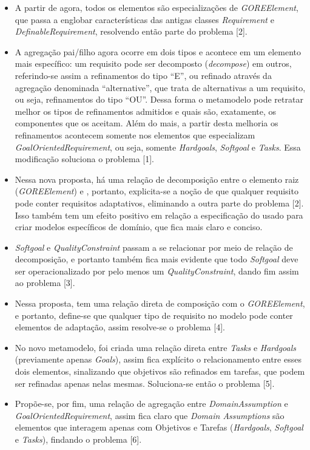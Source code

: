 \begin{itemize}
	\item A partir de agora, todos os elementos são especializações de \textit{GOREElement}, que passa a englobar características das antigas classes \textit{Requirement} e \textit{DefinableRequirement}, resolvendo então parte do problema [2]. 

	\item A agregação pai/filho agora ocorre em dois tipos e acontece em um elemento mais específico: um requisito pode ser decomposto (\textit{decompose}) em outros, referindo-se assim a refinamentos do tipo ``E'', ou refinado através da agregação denominada ``alternative'', que trata de alternativas a um requisito, ou seja, refinamentos do tipo ``OU''. Dessa forma o metamodelo pode retratar melhor os tipos de refinamentos admitidos e quais são, exatamente, os componentes que  os aceitam. Além do mais, a partir desta melhoria os refinamentos acontecem somente nos elementos que especializam \textit{GoalOrientedRequirement}, ou seja, somente \textit{Hardgoals}, \textit{Softgoal} e \textit{Tasks}. Essa modificação soluciona o problema [1].

	\item Nessa nova proposta, há uma relação de decomposição entre o elemento raiz (\textit{GOREElement}) e \awreq, portanto, explicita-se a noção de que qualquer requisito pode conter requisitos adaptativos, eliminando a outra parte do problema [2]. Isso também tem um efeito positivo em relação a especificação do \xml usado para criar modelos específicos de domínio, que fica mais claro e conciso.
	
	\item \textit{Softgoal} e \textit{QualityConstraint} passam a se relacionar por meio de relação de decomposição, e portanto também fica mais evidente que todo \textit{Softgoal} deve ser operacionalizado por pelo menos um \textit{QualityConstraint}, dando fim assim ao problema [3].
	
	\item Nessa proposta, \awreqs tem uma relação direta de composição com o \textit{GOREElement}, e portanto, define-se que qualquer tipo de requisito no modelo pode conter elementos de adaptação, assim resolve-se o problema [4].
	
	\item No novo metamodelo, foi criada uma relação direta entre \textit{Tasks} e \textit{Hardgoals} (previamente apenas \textit{Goals}), assim fica explícito o relacionamento entre esses dois elementos, sinalizando que objetivos são refinados em tarefas, que podem ser refinadas apenas nelas mesmas. Soluciona-se então o problema [5].
	
	\item Propõe-se, por fim, uma relação de agregação entre \textit{DomainAssumption} e \textit{GoalOrientedRequirement}, assim fica claro que \textit{Domain Assumptions} são elementos que interagem apenas com Objetivos e Tarefas (\textit{Hardgoals}, \textit{Softgoal} e \textit{Tasks}), findando o problema [6].
	
\end{itemize}

